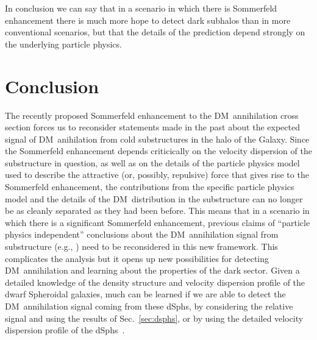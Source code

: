 \documentclass[aps,prd,twocolumn,amsmath,amssymb,floatfix,nofootinbib,10pt]{revtex4}
\newcommand{\eg}{e.g.}
\newcommand{\DM}{DM}
\newcommand{\dSphs}{dSphs}
\begin{document}
In conclusion we can say that in a scenario in which there is
Sommerfeld enhancement there is much more hope to detect dark subhalos
than in more conventional scenarios, but that the details of the
prediction depend strongly on the underlying particle physics.

\section{Conclusion}

The recently proposed Sommerfeld enhancement to the \DM\ annihilation
cross section forces us to reconsider statements made in the past
about the expected signal of \DM\ anihilation from cold substructures
in the halo of the Galaxy. Since the Sommerfeld enhancement depends
criticically on the velocity dispersion of the substructure in
question, as well as on the details of the particle physics model used
to describe the attractive (or, possibly, repulsive) force that gives
rise to the Sommerfeld enhancement, the contributions from the
specific particle physics model and the details of the \DM\
distribution in the substructure can no longer be as cleanly separated
as they had been before. This means that in a scenario in which there
is a significant Sommerfeld enhancement, previous claims of ``particle
physics independent'' conclusions about the \DM\ annihilation signal
from substructure (\eg,
\cite{2007PhRvD..75h3526S,2008Natur.456...73S}) need to be
reconsidered in this new framework. This complicates the analysis but
it opens up new possibilities for detecting \DM\ annihilation and
learning about the properties of the dark sector. Given a detailed
knowledge of the density structure and velocity dispersion profile of
the dwarf Spheroidal galaxies, much can be learned if we are able to
detect the \DM\ annihilation signal coming from these \dSphs, by
considering the relative signal and using the results of
Sec.~\ref{sec:dsphs}, or by using the detailed velocity dispersion
profile of the \dSphs\ \cite{2009arXiv0902.0362R}.
\end{document}
